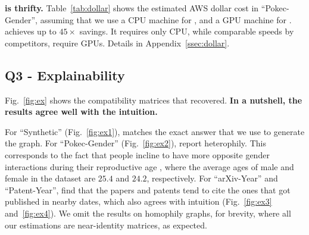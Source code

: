 \textbf{\method is thrifty.}
Table~\ref{tab:dollar} shows the estimated AWS dollar cost in ``Pokec-Gender'', assuming that we use a CPU machine for \method, and a GPU machine for \gcn.
\method achieves up to $45\times$ savings. 
It requires only CPU, while comparable speeds by competitors, require GPUs. %
Details in Appendix~\ref{ssec:dollar}.

\subsection{Q3 - Explainability} \label{ssec:qtexplain}


Fig.~\ref{fig:ex} shows the compatibility matrices that \method recovered.
\textbf{In a nutshell, the results agree well with the intuition.}

For ``Synthetic'' (Fig.~\ref{fig:ex1}), \method matches the exact answer that we use to generate the graph.
For ``Pokec-Gender'' (Fig.~\ref{fig:ex2}), \method report heterophily.
This corresponds to the fact that people incline to have more opposite gender interactions during their reproductive age \cite{ghosh2019quantifying}, where the average ages of male and female in the dataset are $25.4$ and $24.2$, respectively.
For ``arXiv-Year'' and ``Patent-Year'',
\method find that the papers and patents tend to cite the ones that got published in nearby dates, which also agrees with intuition (Fig.~\ref{fig:ex3} and~\ref{fig:ex4}).
We omit the results on homophily graphs, for brevity, where all our estimations are near-identity matrices, as expected.

